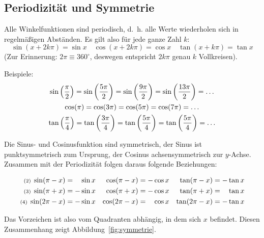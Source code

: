 \subsection{Periodizität und Symmetrie}\label{sec:trig:perioden}
Alle Winkelfunktionen sind periodisch, d.~h. alle Werte wiederholen sich in
regelmäßigen Abständen. Es gilt also für jede ganze Zahl $k$:
\[\sin(x+2k\pi) = \sin x \quad \cos(x+2k\pi) = \cos x \quad \tan(x+k\pi) =
\tan x\] (Zur Erinnerung: $2\pi \equiv 360^\circ$, deswegen entspricht $2k\pi$ genau $k$ Vollkreisen).

\newpar
Beispiele:
\begin{gather*}
\sin\left(\frac{\pi}{2}\right) = \sin\left(\frac{5\pi}{2} \right)=
\sin\left(\frac{9\pi}{2} \right)= \sin\left(\frac{13\pi}{2} \right) = \dots\\
\cos(\pi) = \cos(3\pi) = \cos(5\pi) = \cos(7\pi) = \dots\\
\tan\left(\frac{\pi}{4}\right) = \tan\left(\frac{3\pi}{4}\right) =
\tan\left(\frac{5\pi}{4}\right) = \tan\left(\frac{5\pi}{4}\right) = \dots
\end{gather*}

\newpar

Die Sinus- und Cosinusfunktion sind symmetrisch, der Sinus ist
punktsymmetrisch zum Ursprung, der Cosinus achsensymmetrisch zur $y$-Achse.
Zusammen mit der Periodizität folgen daraus folgende Beziehungen:

\begin{align*}
\text{\scriptsize(2) } \sin(\pi-x)&= \phantom{-}\sin x& \cos(\pi-x)&=-\cos x &
\tan(\pi-x)
&= -\tan x\\
\text{\scriptsize(3) }\sin(\pi+x)&= -\sin x & \cos(\pi+x)&=-\cos x &
\tan(\pi+x)
&= \phantom{-}\tan x\\
\text{\scriptsize(4) } \sin(2\pi-x)&= -\sin x& \cos(2\pi-x)&=\phantom{-}\cos x
& \tan(2\pi-x)
&= -\tan x\\
\end{align*}

Das Vorzeichen ist also vom Quadranten abhängig, in dem sich $x$ befindet.
Diesen Zusammenhang zeigt Abbildung~\ref{fig:symmetrie}.

